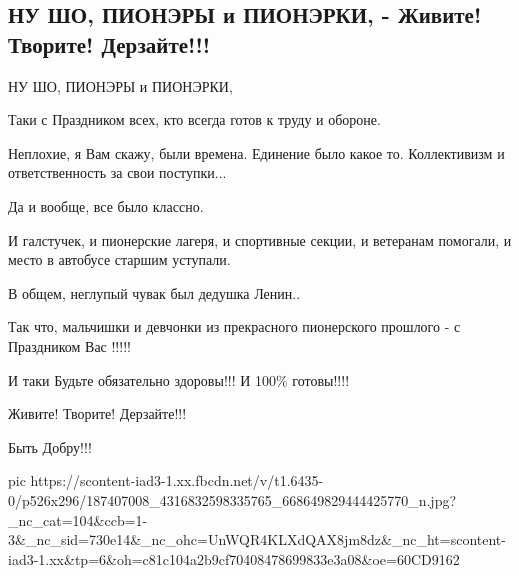  
 
 
 
 

\subsection{НУ ШО, ПИОНЭРЫ и ПИОНЭРКИ, - Живите! Творите! Дерзайте!!!}

НУ ШО, ПИОНЭРЫ и ПИОНЭРКИ, 

Таки с Праздником всех, кто всегда готов к труду и обороне. 

Неплохие, я Вам скажу, были времена. Единение было какое то. Коллективизм и
ответственность за свои поступки... 

Да и вообще, все было классно. 

И галстучек, и пионерские лагеря, и спортивные секции, и ветеранам помогали, и
место в автобусе старшим уступали. 

В общем, неглупый чувак был дедушка Ленин.. 

Так что, мальчишки и девчонки из прекрасного пионерского прошлого - с
Праздником Вас !!!!! 

И таки Будьте обязательно здоровы!!! И 100\% готовы!!!! 

Живите! Творите! Дерзайте!!! 

Быть Добру!!!

\ifcmt
  pic https://scontent-iad3-1.xx.fbcdn.net/v/t1.6435-0/p526x296/187407008_4316832598335765_668649829444425770_n.jpg?_nc_cat=104&ccb=1-3&_nc_sid=730e14&_nc_ohc=UnWQR4KLXdQAX8jm8dz&_nc_ht=scontent-iad3-1.xx&tp=6&oh=c81c104a2b9cf70408478699833e3a08&oe=60CD9162
\fi

